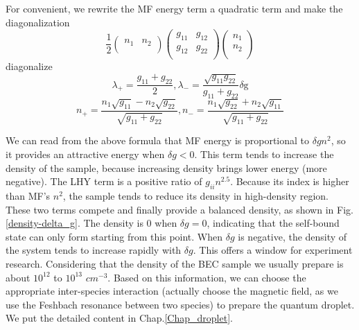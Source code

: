 For convenient, we rewrite the MF energy term a quadratic term and make the diagonalization
\begin{equation}
\frac{1}{2}\left(
\begin{array}{cc}
 n_1 & n_2 \\
\end{array}
\right)\left(
\begin{array}{cc}
 g_{11} & g_{12} \\
 g_{12} & g_{22} \\
\end{array}
\right)\left(
\begin{array}{c}
 n_1 \\
 n_2 \\
\end{array}
\right)
\end{equation}
diagonalize
\begin{equation}
\lambda _+=\frac{g_{11}+g_{22}}{2},\lambda_-=\frac{\sqrt{g_{11}g_{22}}}{g_{11}+g_{22}}\text{$\delta $g}
\end{equation}
\begin{equation}
n_+=\frac{n_1\sqrt{g_{11}}-n_2\sqrt{g_{22}}}{\sqrt{g_{11}+g_{22}}}, n_-=\frac{n_1\sqrt{g_{22}}+n_2\sqrt{g_{11}}}{\sqrt{g_{11}+g_{22}}}
\end{equation}

We can read from the above formula that MF energy is proportional to $\delta g n^2$, so it provides an attractive energy when $\delta g<0$. This term tends to increase the density of the sample, because increasing density brings lower energy (more negative). The LHY term is a positive ratio of $g_{ii}n^2.5$. Because its index is higher than MF's $n^2$, the sample tends to reduce its density in high-density region. These two terms compete and finally provide a balanced density, as shown in Fig. \ref{density-delta_g}. The density is 0 when $\delta g=0$, indicating that the self-bound state can only form starting from this point. When $\delta g$ is negative, the density of the system tends to increase rapidly with $\delta g$. This offers a window for experiment research. Considering that the density of the BEC sample we usually prepare is about $10^{12}$ to $10^{13}$ $cm^{-3}$. Based on this information, we can choose the appropriate inter-species interaction (actually choose the magnetic field, as we use the Feshbach resonance between two species) to prepare the quantum droplet. We put the detailed content in Chap.\ref{Chap_droplet}.

